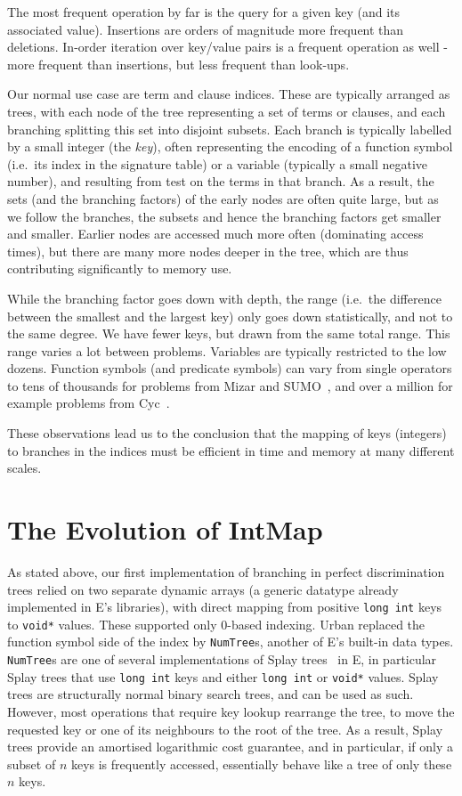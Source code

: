 \documentclass[]{ceurart}
\begin{document}
The most frequent operation by far is the query for a given key (and
its associated value). Insertions are orders of magnitude more
frequent than deletions. In-order iteration over key/value pairs is a
frequent operation as well - more frequent than insertions, but less
frequent than look-ups.

Our normal use case are term and clause indices. These are typically
arranged as trees, with each node of the tree representing a set of
terms or clauses, and each branching splitting this set into disjoint
subsets. Each branch is typically labelled by a small integer (the
\emph{key}), often representing the encoding of a function symbol
(i.e.\ its index in the signature table) or a variable (typically a
small negative number), and resulting from test on the terms in that
branch. As a result, the sets (and the branching factors) of the early
nodes are often quite large, but as we follow the branches, the
subsets and hence the branching factors get smaller and
smaller. Earlier nodes are accessed much more often (dominating access
times), but there are many more nodes deeper in the tree, which are
thus contributing significantly to memory use.

While the branching factor goes down with depth, the range (i.e.\ the
difference between the smallest and the largest key) only goes down
statistically, and not to the same degree. We have fewer keys, but
drawn from the same total range. This range varies a lot between
problems. Variables are typically restricted to the low
dozens. Function symbols (and predicate symbols) can vary from single
operators to tens of thousands for problems from Mizar and
SUMO~\cite{NP:FOISS-2001}, and over a million for example problems
from Cyc~\cite{RRG:CO-2005}.

These observations lead us to the conclusion that the mapping of keys
(integers) to branches in the indices must be efficient in time and
memory at many different scales.

\section{The Evolution of IntMap}

As stated above, our first implementation of branching in perfect
discrimination trees relied on two separate dynamic arrays (a generic
datatype already implemented in E's libraries), with direct mapping
from positive \texttt{long int} keys to \texttt{void*} values. These
supported only 0-based indexing. Urban replaced the function symbol
side of the index by \texttt{NumTree}s, another of E's built-in data
types. \texttt{NumTree}s are one of several implementations of Splay
trees~\cite{ST:JACM-85} in E, in particular Splay trees that use
\texttt{long int} keys and either \texttt{long int} or \texttt{void*}
values. Splay trees are structurally normal binary search trees, and
can be used as such. However, most operations that require key lookup
rearrange the tree, to move the requested key or one of its
neighbours to the root of the tree. As a result, Splay trees provide
an amortised logarithmic cost guarantee, and in particular, if only a
subset of $n$ keys is frequently accessed, essentially behave like a
tree of only these $n$ keys.
\end{document}
